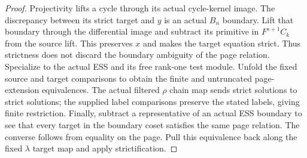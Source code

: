 \begin{proof}
  \leanok
  Projectivity lifts a cycle through its actual cycle-kernel image.
  The discrepancy between its strict target and $y$ is an actual $B_n$
  boundary.  Lift that boundary through the differential image and subtract
  its primitive in $F^{s+1}C_k$ from the source lift.  This preserves $x$
  and makes the target equation strict.  Thus strictness does not discard
  the boundary ambiguity of the page relation.
  Specialize to the actual ESS and its free rank-one test module.  Unfold
  the fixed source and target comparisons to obtain the finite and
  untruncated page-extension equivalences.  The actual filtered $\rho$
  chain map sends strict solutions to strict solutions; the supplied label
  comparisons preserve the stated labels, giving finite restriction.
  Finally, subtract a representative of an actual ESS boundary to see that
  every target in the boundary coset satisfies the same page relation.
  The converse follows from equality on the page.  Pull this equivalence
  back along the fixed $\lambda$ target map and apply strictification.
\end{proof}

